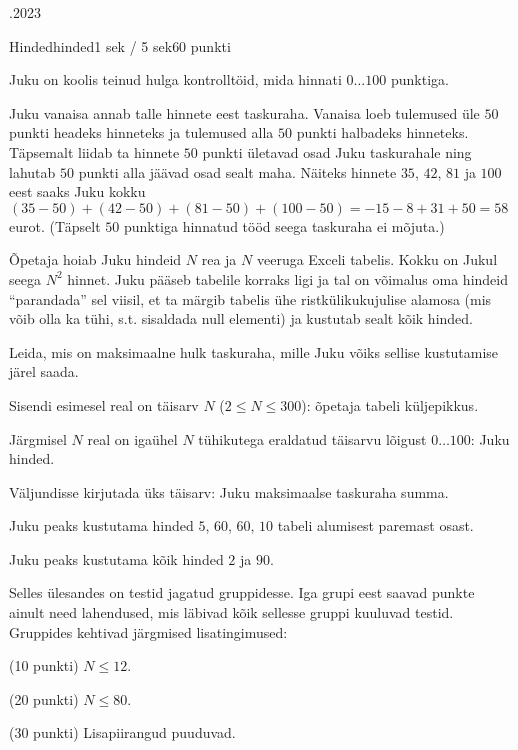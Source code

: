\documentclass[a4paper,11pt]{article}
\begin{document}
\begin{ol}{\eio}{.2023}{\yle}{}
\begin{yl}{5}{Hinded}{hinded}{1 sek / 5 sek}{60 punkti}

Juku on koolis teinud hulga kontrolltöid, mida hinnati $0 \ldots 100$ punktiga.

Juku vanaisa annab talle hinnete eest taskuraha. Vanaisa loeb tulemused üle $50$ punkti headeks hinneteks ja tulemused alla $50$ punkti halbadeks hinneteks. Täpsemalt liidab ta hinnete $50$ punkti ületavad osad Juku taskurahale ning lahutab $50$ punkti alla jäävad osad sealt maha. Näiteks hinnete $35$, $42$, $81$ ja $100$ eest saaks Juku kokku $(35-50)+(42-50)+(81-50)+(100-50) = -15-8+31+50 = 58$ eurot. (Täpselt $50$ punktiga hinnatud tööd seega taskuraha ei mõjuta.)

Õpetaja hoiab Juku hindeid $N$ rea ja $N$ veeruga Exceli tabelis. Kokku on Jukul seega $N^2$ hinnet. Juku pääseb tabelile korraks ligi ja tal on võimalus oma hindeid ``parandada'' sel viisil, et ta märgib tabelis ühe ristkülikukujulise alamosa (mis võib olla ka tühi, s.t. sisaldada null elementi) ja kustutab sealt kõik hinded.

Leida, mis on maksimaalne hulk taskuraha, mille Juku võiks sellise kustutamise järel saada.

\sis Sisendi esimesel real on täisarv $N$ ($2 \le N \le 300$): õpetaja tabeli küljepikkus.

Järgmisel $N$ real on igaühel $N$ tühikutega eraldatud täisarvu lõigust $0 \ldots 100$: Juku hinded.

\val Väljundisse kirjutada üks täisarv: Juku maksimaalse taskuraha summa.

\nde[0]{4cm}{3cm}

Juku peaks kustutama hinded $5$, $60$, $60$, $10$ tabeli alumisest paremast osast.

\nde[1]{4cm}{3cm}

Juku peaks kustutama kõik hinded $2$ ja $90$.

\hnd Selles ülesandes on testid jagatud gruppidesse. Iga grupi eest saavad punkte ainult need lahendused, mis läbivad kõik sellesse gruppi kuuluvad testid. Gruppides kehtivad järgmised lisatingimused:
\begin{xenum}
\item (10 punkti) $N \le 12$.
\item (20 punkti) $N \le 80$.
\item (30 punkti) Lisapiirangud puuduvad.
\end{xenum}

\end{yl}
\end{ol}
\end{document}
